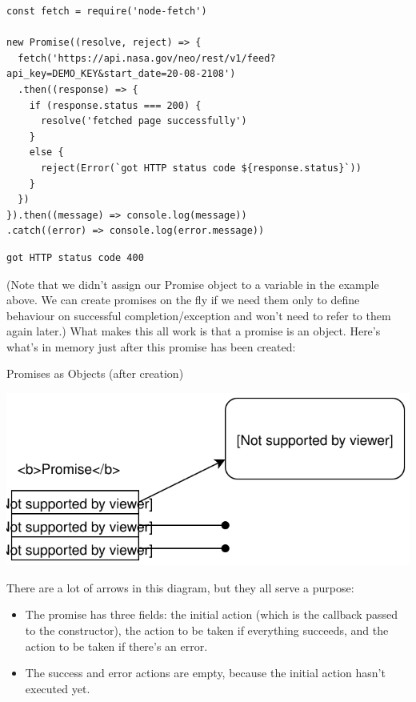 \begin{verbatim}
const fetch = require('node-fetch')

new Promise((resolve, reject) => {
  fetch('https://api.nasa.gov/neo/rest/v1/feed?api_key=DEMO_KEY&start_date=20-08-2108')
  .then((response) => {
    if (response.status === 200) {
      resolve('fetched page successfully')
    }
    else {
      reject(Error(`got HTTP status code ${response.status}`))
    }
  })
}).then((message) => console.log(message))
.catch((error) => console.log(error.message))
\end{verbatim}

\begin{verbatim}
got HTTP status code 400
\end{verbatim}

(Note that we didn't assign our Promise object to a variable in the
example above. We can create promises on the fly if we need them only to
define behaviour on successful completion/exception and won't need to
refer to them again later.) What makes this all work is that a promise
is an object. Here's what's in memory just after this promise has been
created:

Promises as Objects (after creation)

\includegraphics{../../files/promises-object-a.svg}

There are a lot of arrows in this diagram, but they all serve a purpose:

\begin{itemize}
\tightlist
\item
  The promise has three fields: the initial action (which is the
  callback passed to the constructor), the action to be taken if
  everything succeeds, and the action to be taken if there's an error.
\item
  The success and error actions are empty, because the initial action
  hasn't executed yet.
\end{itemize}

